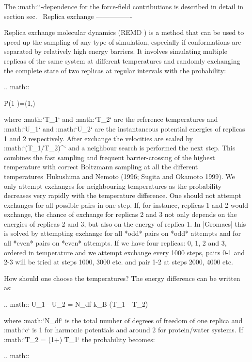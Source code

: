 {The :math:`\lambda`-dependence for the force-field contributions is
described in detail in section sec. 
Replica exchange
----------------

Replica exchange molecular dynamics (REMD
) is a
method that can be used to speed up the sampling of any type of
simulation, especially if conformations are separated by relatively high
energy barriers. It involves simulating multiple replicas of the same
system at different temperatures and randomly exchanging the complete
state of two replicas at regular intervals with the probability:

.. math::

   P(1 )=\min\left(1,\exp{} \right)

where :math:`T_1` and :math:`T_2` are the reference temperatures and
:math:`U_1` and :math:`U_2` are the instantaneous potential energies of
replicas 1 and 2 respectively. After exchange the velocities are scaled
by :math:`(T_1/T_2)^{}` and a neighbour search is performed the
next step. This combines the fast sampling and frequent barrier-crossing
of the highest temperature with correct Boltzmann sampling at all the
different temperatures Hukushima and Nemoto (1996; Sugita and Okamoto
1999). We only attempt exchanges for neighbouring temperatures as the
probability decreases very rapidly with the temperature difference. One
should not attempt exchanges for all possible pairs in one step. If, for
instance, replicas 1 and 2 would exchange, the chance of exchange for
replicas 2 and 3 not only depends on the energies of replicas 2 and 3,
but also on the energy of replica 1. In |Gromacs| this is solved by
attempting exchange for all *odd* pairs on *odd* attempts and for all
*even* pairs on *even* attempts. If we have four replicas: 0, 1, 2 and
3, ordered in temperature and we attempt exchange every 1000 steps,
pairs 0-1 and 2-3 will be tried at steps 1000, 3000 etc. and pair 1-2 at
steps 2000, 4000 etc.

How should one choose the temperatures? The energy difference can be
written as:

.. math:: U_1 - U_2 =  N_{df}  k_B (T_1 - T_2)

where :math:`N_{df}` is the total number of degrees of freedom of one
replica and :math:`c` is 1 for harmonic potentials and around 2 for
protein/water systems. If :math:`T_2 = (1+\epsilon) T_1` the probability
becomes:

.. math::

}
